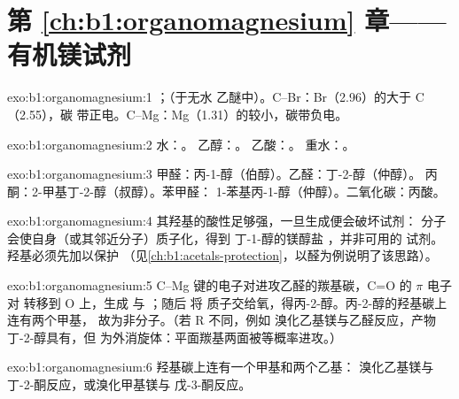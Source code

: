 \section*{第 \ref{ch:b1:organomagnesium} 章——有机镁试剂}

\begin{solution}{exo:b1:organomagnesium:1}
；（于无水
乙醚中）。C--Br：Br（2.96）的大于 C（2.55），碳
带正电。C--Mg：Mg（1.31）的较小，碳带负电。
\end{solution}

\begin{solution}{exo:b1:organomagnesium:2}
水：。
乙醇：。
乙酸：。
重水：。
\end{solution}

\begin{solution}{exo:b1:organomagnesium:3}
甲醛：丙-1-醇（伯醇）。乙醛：丁-2-醇（仲醇）。
丙酮：2-甲基丁-2-醇（叔醇）。苯甲醛：
1-苯基丙-1-醇（仲醇）。二氧化碳：丙酸。
\end{solution}

\begin{solution}{exo:b1:organomagnesium:4}
其羟基的酸性足够强，一旦生成便会破坏试剂：
分子会使自身（或其邻近分子）质子化，得到
丁-1-醇的镁醇盐 ，并非可用的
试剂。羟基必须先加以保护
（见\cref{ch:b1:acetals-protection}，以醛为例说明了该思路）。
\end{solution}

\begin{solution}{exo:b1:organomagnesium:5}
C--Mg 键的电子对进攻乙醛的羰基碳，C=O 的 $\pi$ 电子对
转移到 O 上，生成  与 ；随后  将
质子交给氧，得丙-2-醇。丙-2-醇的羟基碳上连有两个甲基，
故为非分子。（若 R 不同，例如
溴化乙基镁与乙醛反应，产物丁-2-醇具有，但
为外消旋体：平面羰基两面被等概率进攻。）
\end{solution}

\begin{solution}{exo:b1:organomagnesium:6}
羟基碳上连有一个甲基和两个乙基：
溴化乙基镁与丁-2-酮反应，或溴化甲基镁与
戊-3-酮反应。
\end{solution}

